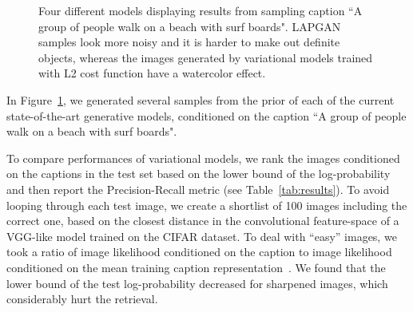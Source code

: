 \documentclass{article} %
\begin{document}
\vspace{-0.5cm}
\begin{figure}[!h]
\captionsetup[subfigure]{labelformat=empty}
\begin{center}
\quad
%
\quad
%
\quad
%
\quad
%
\end{center}
\caption{Four different models displaying results from sampling caption ``A group of people walk on a beach with surf boards". LAPGAN samples look more noisy and it is harder to make out definite objects, whereas the images generated by variational models trained with L2 cost function have a watercolor effect.}
\label{fig:diffmodels}
\vspace{-0.4cm}
\end{figure}

In Figure~\ref{fig:diffmodels}, we generated several samples from the prior of each of the current state-of-the-art generative models, conditioned on the caption ``A group of people walk on a beach with surf boards".

To compare performances of variational models, we rank the images conditioned on the captions in the test set based on the lower bound of the log-probability and then report the Precision-Recall metric (see Table~\ref{tab:results}). To avoid looping through each test image, we create a shortlist of 100 images including the correct one, based on the closest distance in the convolutional feature-space of a VGG-like model trained on the CIFAR dataset. To deal with ``easy'' images, we took a ratio of image 
likelihood conditioned on the caption to image likelihood conditioned on the mean training caption representation~\cite{kiros_captions}. 
We found that the lower bound of the test log-probability decreased for sharpened images, which considerably hurt the retrieval.
\end{document}
